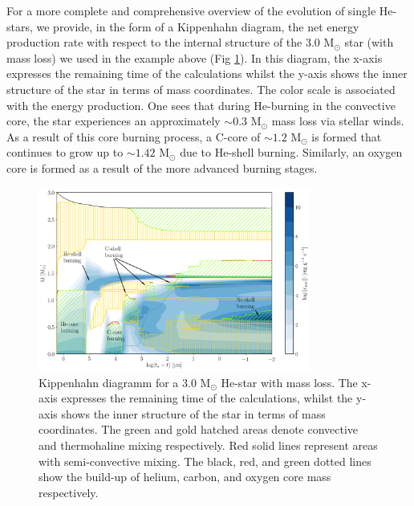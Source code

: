 \documentclass[../../main/thesis_msc.tex]{subfiles}
\begin{document}
				For a more complete and comprehensive overview of the evolution of single He-stars, we provide, in the form of a Kippenhahn diagram, the net energy production rate with respect to the internal structure of the $3.0$ M$_{\odot}$ star (with mass loss) we used in the example above (Fig \ref{fig:Kipp_3p0_ch1}). In this diagram, the x-axis expresses the remaining time of the calculations whilst the y-axis shows the inner structure of the star in terms of mass coordinates. The color scale is associated with the energy production. One sees that during He-burning in the convective core, the star experiences an approximately $\sim 0.3$ M$_{\odot}$ mass loss via stellar winds. As a result of this core burning process, a C-core of $\sim 1.2$ M$_{\odot}$ is formed that continues to grow up to $\sim 1.42$ M$_{\odot}$ due to He-shell burning. Similarly, an oxygen core is formed as a result of the more advanced burning stages.
				
				\begin{figure}[t]
					\centering
					\includegraphics[width=0.8\textwidth]{../figures/chapter1/Kippenhahn_intro.png}
					\caption{Kippenhahn diagramm for a $3.0$ M$_{\odot}$ He-star with mass loss. The x-axis expresses the remaining time of the calculations, whilst the y-axis shows the inner structure of the star in terms of mass coordinates. The green and gold hatched areas denote convective and thermohaline mixing respectively. Red solid lines represent areas with semi-convective mixing. The black, red, and green dotted lines show the build-up of helium, carbon, and oxygen core mass respectively.}
					\label{fig:Kipp_3p0_ch1}
				\end{figure}

				
				
				
				
				
				
				
\end{document}
